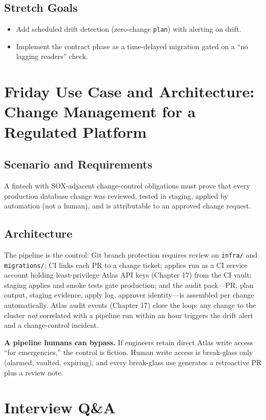 \subsection*{Stretch Goals}
\begin{itemize}
    \item Add scheduled drift detection (zero-change \texttt{plan}) with alerting on drift.
    \item Implement the contract phase as a time-delayed migration gated on a ``no lagging readers'' check.
\end{itemize}

\section{Friday Use Case and Architecture: Change Management for a Regulated Platform}
\subsection{Scenario and Requirements}
A fintech with SOX-adjacent change-control obligations must prove that every production database change was reviewed, tested in staging, applied by automation (not a human), and is attributable to an approved change request.

\subsection{Architecture}
The pipeline is the control: Git branch protection requires review on \texttt{infra/} and \texttt{migrations/}; CI links each PR to a change ticket; applies run as a CI service account holding least-privilege Atlas API keys (Chapter 17) from the CI vault; staging applies and smoke tests gate production; and the audit pack---PR, plan output, staging evidence, apply log, approver identity---is assembled per change automatically. Atlas audit events (Chapter 17) close the loop: any change to the cluster \emph{not} correlated with a pipeline run within an hour triggers the drift alert and a change-control incident.

\begin{pitfall}
\textbf{A pipeline humans can bypass.} If engineers retain direct Atlas write access ``for emergencies,'' the control is fiction. Human write access is break-glass only (alarmed, vaulted, expiring), and every break-glass use generates a retroactive PR plus a review note.
\end{pitfall}

\section{Interview Q\&A}
